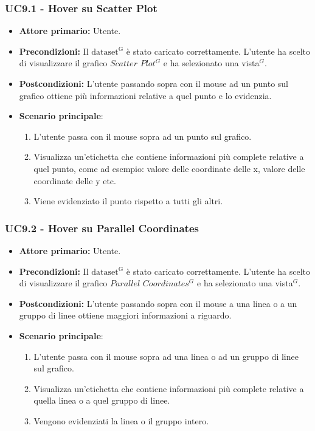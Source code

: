 \subsubsection{UC9.1 - Hover su Scatter Plot}
\label{sec:UC9.1}
\begin{itemize}
    \item \textbf{Attore primario:} Utente.
    \item \textbf{Precondizioni:} Il ${\mathrm{dataset^{G}}}$ è stato caricato correttamente. L'utente ha scelto di visualizzare il grafico $Scatter$ $Plot^{G}$ e ha selezionato una vista$^{G}$.
    \item \textbf{Postcondizioni:} L'utente passando sopra con il mouse ad un punto sul grafico ottiene più informazioni relative a quel punto e lo evidenzia.
    \item \textbf{Scenario principale}: 
    \begin{enumerate}
		\item L'utente passa con il mouse sopra ad un punto sul grafico.
		\item Visualizza un'etichetta che contiene informazioni più complete relative a quel punto, come ad esempio: valore delle coordinate delle x, valore delle coordinate delle y etc. 
		\item Viene evidenziato il punto rispetto a tutti gli altri.
	\end{enumerate}
\end{itemize}

\subsubsection{UC9.2 - Hover su Parallel Coordinates}
\label{sec:UC9.2}
\begin{itemize}
    \item \textbf{Attore primario:} Utente.
    \item \textbf{Precondizioni:} Il ${\mathrm{dataset^{G}}}$ è stato caricato correttamente. L'utente ha scelto di visualizzare il grafico $Parallel$ $Coordinates^{G}$ e ha selezionato una vista$^{G}$.
    \item \textbf{Postcondizioni:} L'utente passando sopra con il mouse a una linea o a un gruppo di linee ottiene maggiori informazioni a riguardo.
    \item \textbf{Scenario principale}:
    \begin{enumerate}
		\item L'utente passa con il mouse sopra ad una linea o ad un gruppo di linee sul grafico.
		\item Visualizza un'etichetta che contiene informazioni più complete relative a quella linea o a quel gruppo di linee.
		\item Vengono evidenziati la linea o il gruppo intero.
	\end{enumerate}
\end{itemize}

